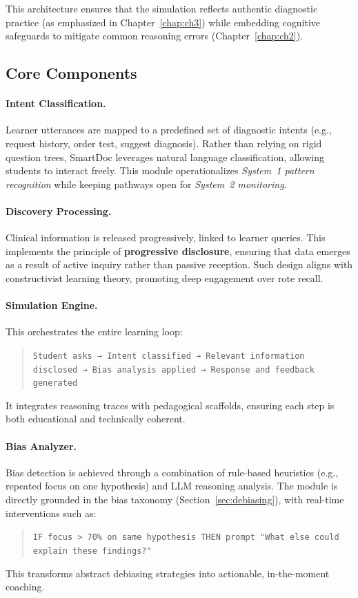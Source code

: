 This architecture ensures that the simulation reflects authentic diagnostic practice (as emphasized in Chapter~\ref{chap:ch3}) while embedding cognitive safeguards to mitigate common reasoning errors (Chapter~\ref{chap:ch2}).

\subsection{Core Components}

\paragraph{Intent Classification.}
Learner utterances are mapped to a predefined set of diagnostic intents (e.g., request history, order test, suggest diagnosis). Rather than relying on rigid question trees, SmartDoc leverages natural language classification, allowing students to interact freely. This module operationalizes \textit{System~1 pattern recognition} while keeping pathways open for \textit{System~2 monitoring}.

\paragraph{Discovery Processing.}
Clinical information is released progressively, linked to learner queries. This implements the principle of \textbf{progressive disclosure}, ensuring that data emerges as a result of active inquiry rather than passive reception. Such design aligns with constructivist learning theory, promoting deep engagement over rote recall.

\paragraph{Simulation Engine.}
This orchestrates the entire learning loop:
\begin{quote}
\texttt{Student asks → Intent classified → Relevant information disclosed → Bias analysis applied → Response and feedback generated}
\end{quote}
It integrates reasoning traces with pedagogical scaffolds, ensuring each step is both educational and technically coherent.

\paragraph{Bias Analyzer.}
Bias detection is achieved through a combination of rule-based heuristics (e.g., repeated focus on one hypothesis) and LLM reasoning analysis. The module is directly grounded in the bias taxonomy (Section~\ref{sec:debiasing}), with real-time interventions such as:
\begin{quote}
\texttt{IF focus > 70\% on same hypothesis THEN prompt "What else could explain these findings?"}
\end{quote}
This transforms abstract debiasing strategies into actionable, in-the-moment coaching.

